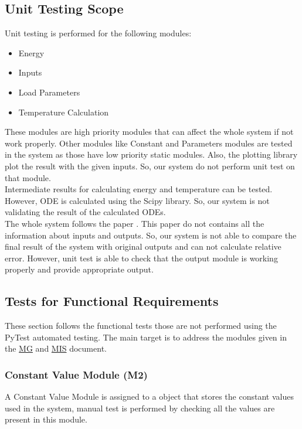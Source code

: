 \documentclass[12pt, titlepage]{article}
\begin{document}
\subsection{Unit Testing Scope}
Unit testing is performed for the following modules: 

\begin{itemize}
    \item Energy 
    \item Inputs
    \item Load Parameters
    \item Temperature Calculation
\end{itemize}
These modules are high priority modules that can affect the whole system if not work properly. Other modules like Constant and Parameters modules are tested in the system as those have low priority static modules. Also, the plotting library plot the result with the given inputs. So, our system do not perform unit test on that module. \\  
 Intermediate results for calculating energy and temperature can be tested. However, ODE is calculated using the Scipy library. So, our system is not validating the result of the calculated ODEs. \\
The whole system follows the paper \cite{MathsModel}. This paper do not contains all the information about inputs and outputs. So, our system is not able to compare the final result of the system with original outputs and can not calculate relative error. However, unit test is able to check that the output module is working properly and provide appropriate output.   

\subsection{Tests for Functional Requirements} 
These section follows the functional tests those are not performed using the PyTest automated testing. The main target is to address the modules given in the \href{https://github.com/DeeshaPatel/CAS-741-Solar-Cooker/blob/f238dbff9720fb98d3323fd5832d04ab9ce7597f/docs/Design/SoftArchitecture/MG.pdf}{MG} and \href{https://github.com/DeeshaPatel/CAS-741-Solar-Cooker/blob/f238dbff9720fb98d3323fd5832d04ab9ce7597f/docs/Design/SoftDetailedDes/MIS.pdf}{MIS} document. 

\subsubsection{Constant Value Module (M2)}
A Constant Value Module is assigned to a object that stores the constant values used in the system, manual test is performed by checking all the values are present in this module.
\end{document}

